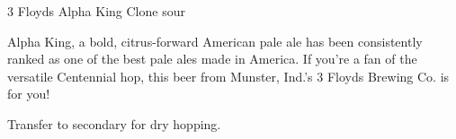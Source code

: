 \stylesection{\styleamericanpaleale}

\begin{recipie}{3 Floyds Alpha King Clone}
sour
\begin{aboutblock}
Alpha King, a bold, citrus-forward American pale ale has been consistently ranked
as one of the best pale ales made in America. If you're a fan of the versatile
Centennial hop, this beer from Munster, Ind.'s 3 Floyds Brewing Co. is for you!
\sourceaha
\end{aboutblock}


\begin{methodandtiming}
 
\begin{mashsteps}
\end{mashsteps}

\begin{fermentationsteps}
\end{fermentationsteps}

\begin{directions}
Transfer to secondary for dry hopping.
\end{directions}

\end{methodandtiming}

\pagebreak

\begin{ingredientsblock}

\begin{malts}
\end{malts}

\begin{hops}
\end{hops}


\end{ingredientsblock}

\end{recipie}


